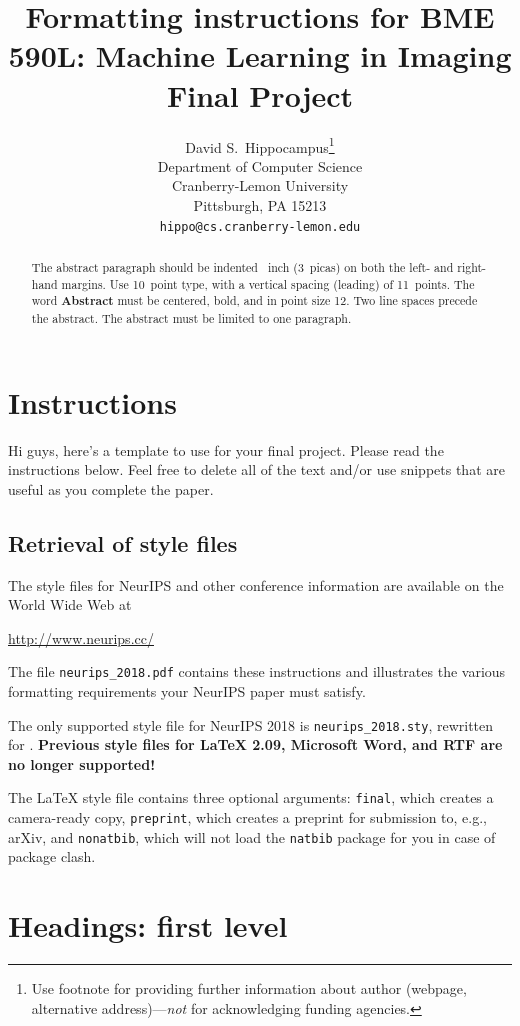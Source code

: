 \documentclass{article}
\title{Formatting instructions for BME 590L: Machine Learning in Imaging Final Project}
\author{%
  David S.~Hippocampus\thanks{Use footnote for providing further information
    about author (webpage, alternative address)---\emph{not} for acknowledging
    funding agencies.} \\
  Department of Computer Science\\
  Cranberry-Lemon University\\
  Pittsburgh, PA 15213 \\
  \texttt{hippo@cs.cranberry-lemon.edu} \\
}
\begin{document}

\maketitle

\begin{abstract}
  The abstract paragraph should be indented ~inch (3~picas) on
  both the left- and right-hand margins. Use 10~point type, with a vertical
  spacing (leading) of 11~points.  The word \textbf{Abstract} must be centered,
  bold, and in point size 12. Two line spaces precede the abstract. The abstract
  must be limited to one paragraph.
\end{abstract}

\section{Instructions}

Hi guys, here's a template to use for your final project. Please read the instructions below. Feel free to delete all of the text and/or use snippets that are useful as you complete the paper.


\subsection{Retrieval of style files}

The style files for NeurIPS and other conference information are available on
the World Wide Web at
\begin{center}
  \url{http://www.neurips.cc/}
\end{center}
The file \verb+neurips_2018.pdf+ contains these instructions and illustrates the
various formatting requirements your NeurIPS paper must satisfy.

The only supported style file for NeurIPS 2018 is \verb+neurips_2018.sty+,
rewritten for \LaTeXe{}.  \textbf{Previous style files for \LaTeX{} 2.09,
  Microsoft Word, and RTF are no longer supported!}

The \LaTeX{} style file contains three optional arguments: \verb+final+, which
creates a camera-ready copy, \verb+preprint+, which creates a preprint for
submission to, e.g., arXiv, and \verb+nonatbib+, which will not load the
\verb+natbib+ package for you in case of package clash.

\section{Headings: first level}
\label{headings}
\end{document}
